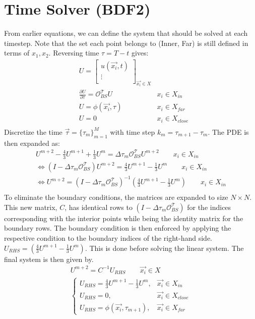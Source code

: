 \documentclass[a4paper]{article}      %
\begin{document}
\section*{Time Solver (BDF2)}
From earlier equations, we can define the system that should be solved at each timestep. Note that the set each point belongs to (Inner, Far) is still defined in terms of $x_1, x_2$. Reversing time $ \tau = T - t$ gives:
\begin{equation}
\begin{aligned}
	&U = \begin{bmatrix} 	
 	u(\vec{x_i}, t) \\ 
 	\vdots \\
	\end{bmatrix} _{\vec{x_i} \in X}  & \\
 	&\frac{\partial U}{\partial \tau} = \mathcal{O}_{BS}^\mathcal{T} U  &x_i \in X_{in}  \\	
 	&U = \phi(\vec{x_i}, \tau)  &x_i \in X_{far} \\
 	&U = 0 	&x_i \in X_{close} \\
 	\end{aligned} 	 
\end{equation}
Discretize the time $\vec{\tau} = \{\tau_m \}_{m = 1} ^ M$ with time step $ k_m = \tau_{m+1} - \tau_m$. The PDE is then expanded as:
\begin{gather}
U^{m+2} - \frac{4}{3}U^{m+1} + \frac{1}{3}U^{m} = \Delta \tau_m\mathcal{O}_{BS}^\mathcal{T} U^{m+2}  \qquad x_i \in X_{in} \\
\Leftrightarrow (I -\Delta \tau_m\mathcal{O}_{BS}^\mathcal{T} )U^{m+2} =\frac{4}{3}U^{m+1} - \frac{1}{3}U^{m} \qquad x_i \in X_{in} \\
\Leftrightarrow U^{m+2} = (I -\Delta \tau_m\mathcal{O}_{BS}^\mathcal{T})^{-1}(\frac{4}{3}U^{m+1} - \frac{1}{3}U^{m}) \qquad x_i \in X_{in} \\
\end{gather}
To eliminate the boundary conditions, the matrices are expanded to size $N \times N$. This new matrix, $C$, has identical rows to $(I -\Delta \tau_m\mathcal{O}_{BS}^\mathcal{T})$ for the indices corresponding with the interior points while being the identity matrix for the boundary rows. The boundary condition is then enforced by applying the respective condition to the boundary indices of the right-hand side. $U_{RHS} = (\frac{4}{3}U^{m+1} - \frac{1}{3}U^{m})$. This is done before solving the linear system. The final system is then given by.
\begin{equation}
\begin{gathered}
U^{m+2} = C^{-1} U_{RHS} \qquad \vec{x_i} \in X \\
\begin{cases}
U_{RHS} = \frac{4}{3}U^{m+1} - \frac{1}{3}U^{m}, & \vec{x_i}  \in X_{in}\\
U_{RHS} = 0, & \vec{x_i}  \in X_{close}\\
U_{RHS} = \phi(\vec{x_i},\tau_{m+1}), & \vec{x_i}  \in X_{far}
\end{cases}
\end{gathered}
\end{equation}
\end{document}
